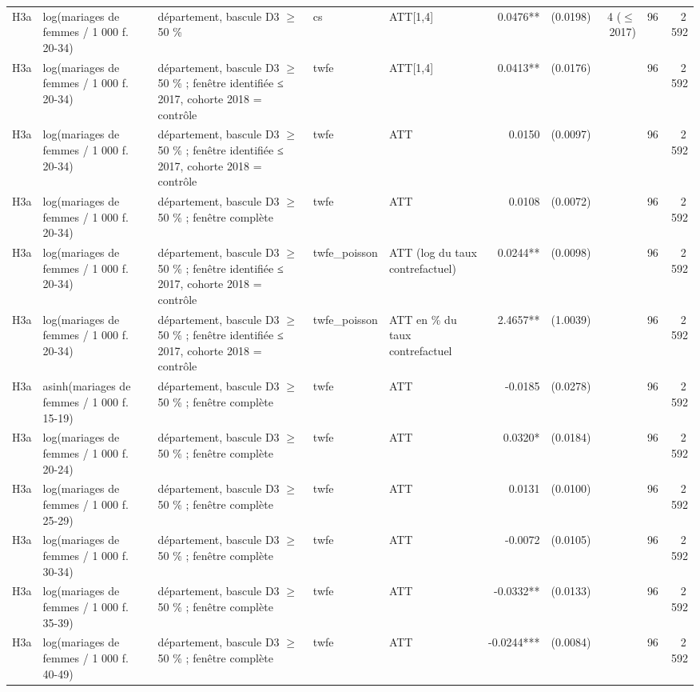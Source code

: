 \begin{table}
\begin{threeparttable}
\begin{tabular}{lp{3.8cm}p{4.6cm}lp{3.5cm}rrrrr}
H3a & log(mariages de femmes / 1 000 f. 20-34) & département, bascule D3 $\geq$ 50 \% & cs & ATT[1,4] & 0.0476** & (0.0198) & 4 ($\leq$ 2017) & 96 & 2\,592 \\
H3a & log(mariages de femmes / 1 000 f. 20-34) & département, bascule D3 $\geq$ 50 \% ; fenêtre identifiée ≤ 2017, cohorte 2018 = contrôle & twfe & ATT[1,4] & 0.0413** & (0.0176) &  & 96 & 2\,592 \\
H3a & log(mariages de femmes / 1 000 f. 20-34) & département, bascule D3 $\geq$ 50 \% ; fenêtre identifiée ≤ 2017, cohorte 2018 = contrôle & twfe & ATT & 0.0150 & (0.0097) &  & 96 & 2\,592 \\
H3a & log(mariages de femmes / 1 000 f. 20-34) & département, bascule D3 $\geq$ 50 \% ; fenêtre complète & twfe & ATT & 0.0108 & (0.0072) &  & 96 & 2\,592 \\
H3a & log(mariages de femmes / 1 000 f. 20-34) & département, bascule D3 $\geq$ 50 \% ; fenêtre identifiée ≤ 2017, cohorte 2018 = contrôle & twfe\_poisson & ATT (log du taux contrefactuel) & 0.0244** & (0.0098) &  & 96 & 2\,592 \\
H3a & log(mariages de femmes / 1 000 f. 20-34) & département, bascule D3 $\geq$ 50 \% ; fenêtre identifiée ≤ 2017, cohorte 2018 = contrôle & twfe\_poisson & ATT en \% du taux contrefactuel & 2.4657** & (1.0039) &  & 96 & 2\,592 \\
H3a & asinh(mariages de femmes / 1 000 f. 15-19) & département, bascule D3 $\geq$ 50 \% ; fenêtre complète & twfe & ATT & -0.0185 & (0.0278) &  & 96 & 2\,592 \\
H3a & log(mariages de femmes / 1 000 f. 20-24) & département, bascule D3 $\geq$ 50 \% ; fenêtre complète & twfe & ATT & 0.0320* & (0.0184) &  & 96 & 2\,592 \\
H3a & log(mariages de femmes / 1 000 f. 25-29) & département, bascule D3 $\geq$ 50 \% ; fenêtre complète & twfe & ATT & 0.0131 & (0.0100) &  & 96 & 2\,592 \\
H3a & log(mariages de femmes / 1 000 f. 30-34) & département, bascule D3 $\geq$ 50 \% ; fenêtre complète & twfe & ATT & -0.0072 & (0.0105) &  & 96 & 2\,592 \\
H3a & log(mariages de femmes / 1 000 f. 35-39) & département, bascule D3 $\geq$ 50 \% ; fenêtre complète & twfe & ATT & -0.0332** & (0.0133) &  & 96 & 2\,592 \\
H3a & log(mariages de femmes / 1 000 f. 40-49) & département, bascule D3 $\geq$ 50 \% ; fenêtre complète & twfe & ATT & -0.0244*** & (0.0084) &  & 96 & 2\,592 \\

\end{tabular}
\end{threeparttable}
\end{table}
